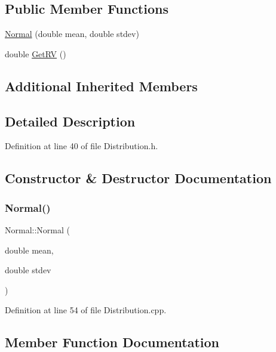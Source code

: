 \subsection*{Public Member Functions}
\begin{DoxyCompactItemize}
\item 
\hyperlink{class_normal_a3c97473adbdc9804bd4d5b0e31d00a0c}{Normal} (double mean, double stdev)
\item 
double \hyperlink{class_normal_a6101d2303601a4f7dfa33fe4b104df7e}{Get\+RV} ()
\end{DoxyCompactItemize}
\subsection*{Additional Inherited Members}


\subsection{Detailed Description}


Definition at line 40 of file Distribution.\+h.



\subsection{Constructor \& Destructor Documentation}
\mbox{\label{class_normal_a3c97473adbdc9804bd4d5b0e31d00a0c}} 
\subsubsection{\texorpdfstring{Normal()}{Normal()}}
{\footnotesize\ttfamily Normal\+::\+Normal (\begin{DoxyParamCaption}\item[{double}]{mean,  }\item[{double}]{stdev }\end{DoxyParamCaption})}



Definition at line 54 of file Distribution.\+cpp.



\subsection{Member Function Documentation}
\mbox{\label{class_normal_a6101d2303601a4f7dfa33fe4b104df7e}} 
